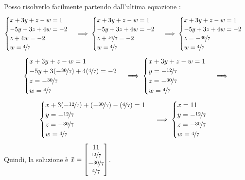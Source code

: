 \documentclass[12pt, letterpaper]{article}
\begin{document}
Posso risolverlo facilmente partendo dall'ultima equazione : \begin{equation}
    \begin{cases}
        x+3y+z-w=1\\ 
        -5y+3z+4w=-2 \\
        z+4w = -2\\  
        w=\nicefrac{4}{7}
    \end{cases}\implies
    \begin{cases}
        x+3y+z-w=1\\ 
        -5y+3z+4w=-2 \\
        z+\nicefrac{16}{7} = -2\\  
        w=\nicefrac{4}{7}
    \end{cases}\implies 
    \begin{cases}
        x+3y+z-w=1\\ 
        -5y+3z+4w=-2 \\
        z=-\nicefrac{30}{7}\\  
        w=\nicefrac{4}{7}
    \end{cases}
\end{equation}\begin{equation}
    \begin{cases}
        x+3y+z-w=1\\ 
        -5y+3(-\nicefrac{30}{7})+4(\nicefrac{4}{7})=-2 \\
        z=-\nicefrac{30}{7}\\  
        w=\nicefrac{4}{7}
    \end{cases}\implies
    \begin{cases}
        x+3y+z-w=1\\ 
        y=-\nicefrac{12}{7} \\
        z=-\nicefrac{30}{7}\\  
        w=\nicefrac{4}{7}
    \end{cases}\implies\end{equation} \begin{equation} \begin{cases}
        x+3(-\nicefrac{12}{7})+(-\nicefrac{30}{7})-(\nicefrac{4}{7})=1\\ 
        y=-\nicefrac{12}{7} \\
        z=-\nicefrac{30}{7}\\  
        w=\nicefrac{4}{7}
    \end{cases}\implies\begin{cases}
        x=11\\ 
        y=-\nicefrac{12}{7} \\
        z=-\nicefrac{30}{7}\\  
        w=\nicefrac{4}{7}\end{cases}
\end{equation}
Quindi, la soluzione è \(\bar x = \begin{bmatrix}11\\\nicefrac{12}{7}\\-\nicefrac{30}{7}\\\nicefrac{4}{7}\end{bmatrix}\).
\end{document}
